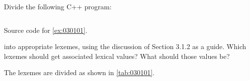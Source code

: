 \begin{exercise}\label{ex:030101}
    Divide the following C++ program:
    \begin{listing}[!ht]
        \inputminted[]{cpp}{03/01/01/ex030101.cpp}
        \caption{Source code for \cref{ex:030101}.}
        \label{code:030101}
    \end{listing}

    \noindent into appropriate lexemes, using the discussion of Section 3.1.2 as a guide. 
    Which lexemes should get associated lexical values? What should those 
    values be?
\end{exercise}
\begin{solution}\label{sol:030101}
    The lexemes are divided as shown in \autoref{tab:030101}.
    
\end{solution}